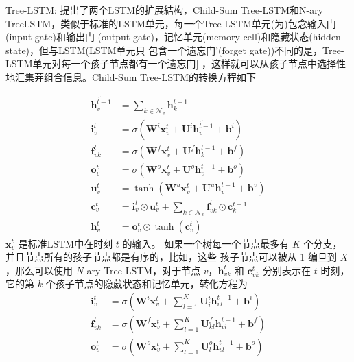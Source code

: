 \documentclass[a4paper,UTF8]{article}
\numberwithin{equation}{section}
\begin{document}
{		Tree-LSTM: \citep{journal/JieZhou2020}提出了两个LSTM的扩展結构，Child-Sum Tree-LSTM和N-ary TreeLSTM，类似于标准的LSTM单元，每一个Tree-LSTM单元(为)包念输入门(input gate)和输出门 (output gate)，记忆单元(memory cell)和隐藏状态(hidden state)，但与LSTM(LSTM单元只 包含一个遗忘门'(forget gate))不同的是，Tree-LSTM单元对每一个孩子节点都有一个遗忘门] ，这样就可以从孩子节点中选择性地汇集茾组合信息。Child-Sum Tree-LSTM的转换方程如下
		
		$$
		\begin{aligned}
			\widetilde{\mathbf{h}_{v}^{t-1}} &=\sum_{k \in \mathcal{N}_{v}} \mathbf{h}_{k}^{t-1} \\
			\mathbf{i}_{v}^{t} &=\sigma\left(\mathbf{W}^{i} \mathbf{x}_{v}^{t}+\mathbf{U}^{i} \widetilde{\mathbf{h}_{v}^{t-1}}+\mathbf{b}^{i}\right) \\
			\mathbf{f}_{v k}^{t} &=\sigma\left(\mathbf{W}^{f} \mathbf{x}_{v}^{t}+\mathbf{U}^{f} \mathbf{h}_{k}^{t-1}+\mathbf{b}^{f}\right) \\
			\mathbf{o}_{v}^{t} &=\sigma\left(\mathbf{W}^{o} \mathbf{x}_{v}^{t}+\mathbf{U}^{o} \mathbf{h}_{v}^{t-1}+\mathbf{b}^{o}\right) \\
			\mathbf{u}_{v}^{t} &=\tanh \left(\mathbf{W}^{u} \mathbf{x}_{v}^{t}+\mathbf{U}^{u} \mathbf{h}_{v}^{t-1}+\mathbf{b}^{v}\right) \\
			\mathbf{c}_{v}^{t} &=\mathbf{i}_{v}^{t} \odot \mathbf{u}_{v}^{t}+\sum_{k \in \mathcal{N}_{v}} \mathbf{f}_{v k}^{t} \odot \mathbf{c}_{k}^{t-1} \\
			\mathbf{h}_{v}^{t} &=\mathbf{o}_{v}^{t} \odot \tanh \left(\mathbf{c}_{v}^{t}\right)
		\end{aligned}
		$$
		$\mathbf{x}_{v}^{t}$ 是标准LSTM中在时刻 $t$ 的输入。
		如果一个树每一个节点最多有 $K$ 个分支，并且节点所有的孩子节点都是有序的，比如，这些 孩子节点可以被从 1 编旦到 $X$ ，那么可以使用 $N$-ary Tree-LSTM，对于节点 $v ， \mathbf{h}_{v k}^{t}$ 和 $\mathbf{c}_{v k}^{t}$ 分别表示在 $t$ 时刻，它的第 $k$ 个孩子节点的隐葳状态和记忆单元，转化方程为
		$$
		\begin{aligned}
			\mathbf{i}_{v}^{t} &=\sigma\left(\mathbf{W}^{i} \mathbf{x}_{v}^{t}+\sum_{l=1}^{K} \mathbf{U}_{i}^{i} \mathbf{h}_{v l}^{t-1}+\mathbf{b}^{i}\right) \\
			\mathbf{f}_{v k}^{t} &=\sigma\left(\mathbf{W}^{f} \mathbf{x}_{v}^{t}+\sum_{l=1}^{K} \mathbf{U}_{k l}^{f} \mathbf{h}_{v l}^{t-1}+\mathbf{b}^{f}\right) \\
			\mathbf{o}_{v}^{t} &=\sigma\left(\mathbf{W}^{o} \mathbf{x}_{v}^{t}+\sum_{l=1}^{K} \mathbf{U}_{l}^{o} \mathbf{h}_{v l}^{t-1}+\mathbf{b}^{o}\right) \\

\end{aligned}$$}
\end{document}
